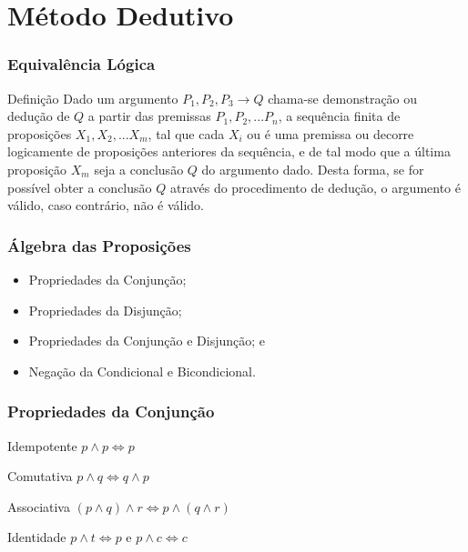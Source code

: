 \documentclass{beamer}
\begin{document}
\section{Método Dedutivo}

\begin{frame}
\frametitle{Equivalência Lógica}

\begin{block}{Definição}
Dado um argumento $P_{1}, P_{2}, P_{3} \rightarrow Q$ chama-se demonstração ou dedução de $Q$ a partir das premissas $P_{1}, P_{2}, . . . P_{n}$, a sequência finita de
proposições $X_{1}, X_{2}, . . . X_{m}$, tal que cada $X_{i}$ ou é uma premissa ou decorre logicamente de proposições anteriores da sequência, e de tal modo que a
última proposição $X_{m}$ seja a conclusão $Q$ do argumento dado. Desta forma, se for possível obter a conclusão $Q$ através do procedimento de dedução, o argumento é válido, caso contrário, não é válido.
\end{block}
\end{frame}

\begin{frame}
\frametitle{Álgebra das Proposições}

\begin{itemize}
	\item Propriedades da Conjunção;
	\item Propriedades da Disjunção;
	\item Propriedades da Conjunção e Disjunção; e
	\item Negação da Condicional e Bicondicional.
\end{itemize}
\end{frame}

\begin{frame}
\frametitle{Propriedades da Conjunção}

\begin{block}{Idempotente}
$p \wedge p \Leftrightarrow p$
\end{block}\vfill

\begin{block}{Comutativa}
$p \wedge q \Leftrightarrow q \wedge p$
\end{block}\vfill

\begin{block}{Associativa}
$(p \wedge q) \wedge r \Leftrightarrow p \wedge (q \wedge r)$
\end{block}\vfill

\begin{block}{Identidade}
$p \wedge t \Leftrightarrow p$ e $p \wedge c \Leftrightarrow c$
\end{block}\vfill

\end{frame}
\end{document}

